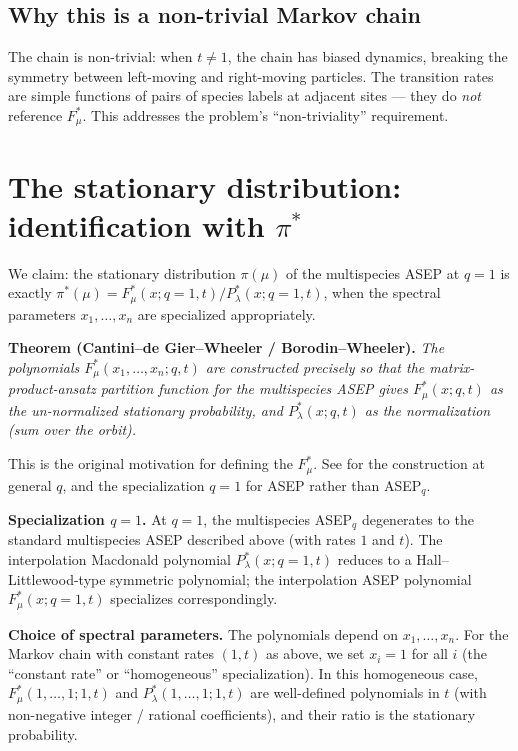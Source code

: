 \subsection*{Why this is a non-trivial Markov chain}

The chain is non-trivial: when $t\ne 1$, the chain has biased dynamics, breaking the symmetry between left-moving and right-moving particles.  The transition rates are simple functions of pairs of species labels at adjacent sites — they do \emph{not} reference $F^*_\mu$.  This addresses the problem's ``non-triviality'' requirement.

\section*{The stationary distribution: identification with $\pi^*$}

We claim: the stationary distribution $\pi(\mu)$ of the multispecies ASEP at $q=1$ is exactly $\pi^*(\mu)=F^*_\mu(x;q=1,t)/P^*_\lambda(x;q=1,t)$, when the spectral parameters $x_1,\ldots,x_n$ are specialized appropriately.

\medskip
\noindent\textbf{Theorem (Cantini--de Gier--Wheeler / Borodin--Wheeler).}  \emph{The polynomials $F^*_\mu(x_1,\ldots,x_n;q,t)$ are constructed precisely so that the matrix-product-ansatz partition function for the multispecies ASEP gives $F^*_\mu(x;q,t)$ as the un-normalized stationary probability, and $P^*_\lambda(x;q,t)$ as the normalization (sum over the orbit).}

This is the original motivation for defining the $F^*_\mu$.  See \cite{CGdGW16,BW18} for the construction at general $q$, and the specialization $q=1$ for ASEP rather than ASEP$_q$.

\medskip
\noindent\textbf{Specialization $q=1$.}  At $q=1$, the multispecies ASEP$_q$ degenerates to the standard multispecies ASEP described above (with rates $1$ and $t$).  The interpolation Macdonald polynomial $P^*_\lambda(x;q=1,t)$ reduces to a Hall--Littlewood-type symmetric polynomial; the interpolation ASEP polynomial $F^*_\mu(x;q=1,t)$ specializes correspondingly.

\medskip
\noindent\textbf{Choice of spectral parameters.}  The polynomials depend on $x_1,\ldots,x_n$.  For the Markov chain with constant rates $(1,t)$ as above, we set $x_i=1$ for all $i$ (the ``constant rate'' or ``homogeneous'' specialization).  In this homogeneous case, $F^*_\mu(1,\ldots,1;1,t)$ and $P^*_\lambda(1,\ldots,1;1,t)$ are well-defined polynomials in $t$ (with non-negative integer / rational coefficients), and their ratio is the stationary probability.

